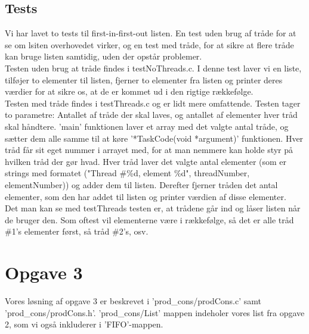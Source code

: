 \subsection{Tests}
\label{O2_Tests}
Vi har lavet to tests til first-in-first-out listen. En test uden brug af tråde for at se om lsiten overhovedet virker, og en test med tråde, for at sikre at flere tråde kan bruge listen samtidig, uden der opstår problemer.
\\Testen uden brug at tråde findes i testNoThreads.c. I denne test laver vi en liste, tilføjer to elementer til listen, fjerner to elementer fra listen og printer deres værdier for at sikre os, at de er kommet ud i den rigtige rækkefølge. 
\\Testen med tråde findes i testThreads.c og er lidt mere omfattende. Testen tager to parametre: Antallet af tråde der skal laves, og antallet af elementer hver tråd skal håndtere. 'main' funktionen laver et array med det valgte antal tråde, og sætter dem alle samme til at køre '*TaskCode(void *argument)' funktionen. Hver tråd får sit eget nummer i arrayet med, for at man nemmere kan holde styr på hvilken tråd der gør hvad. Hver tråd laver det valgte antal elementer (som er strings med formatet ("Thread \#\%d, element \%d", threadNumber, elementNumber)) og adder dem til listen. Derefter fjerner tråden det antal elementer, som den har addet til listen og printer værdien af disse elementer. 
\\Det man kan se med testThreads testen er, at trådene går ind og låser listen når de bruger den. Som oftest vil elementerne være i rækkefølge, så det er alle tråd \#1's elementer først, så tråd \#2's, osv.

\section{Opgave 3}
\label{O3}
Vores løsning af opgave 3 er beskrevet i 'prod_cons/prodCons.c' samt 'prod_cons/prodCons.h'. 'prod_cons/List' mappen indeholer vores list fra opgave 2, som vi også inkluderer i 'FIFO'-mappen.

